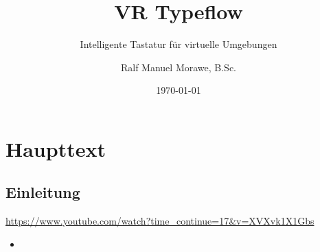 \documentclass{scrreprt}
\begin{document}
	
\titlehead{{\Large Universität Bremen \hfill SoSe~2018\\} Fachbereich 3: Mathematik \& Informatik\\ Bibliothekstr. 1\\ 28XYZ Bremen}
\subject{Masterarbeit}
\title{VR Typeflow}
\subtitle{Intelligente Tastatur für virtuelle Umgebungen}
\author{Ralf Manuel Morawe, B.Sc.}
\date{\today}
\publishers{Begutachtet durch:\\ Prof Dr. Vorn Nachn\\ Prof. Dr. Vorn Nachn}
\maketitle

\tableofcontents

\chapter{Haupttext}

\section{Einleitung}

\lipsum[1-10]

\url{https://www.youtube.com/watch?time_continue=17&v=XVXvk1X1Gbs}

\begin{itemize}
	\item \parencites[35--37]{vive2017}[88--120]{vive2017}[23]{vive2017}
\end{itemize}

\printbibliography[nottype=online]
\printbibliography[title={Online Referenzen}, type=online]
\end{document}
